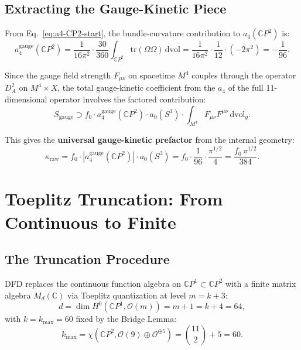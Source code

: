 \documentclass[12pt,a4paper]{article}
\begin{document}
\subsection{Extracting the Gauge-Kinetic Piece}

From Eq.~\eqref{eq:a4-CP2-start}, the bundle-curvature contribution
to $a_4(\mathbb{C}P^2)$ is:
\begin{equation}\label{eq:gauge-kinetic-piece}
a_4^{\mathrm{gauge}}(\mathbb{C}P^2)
= \frac{1}{16\pi^2} \cdot \frac{30}{360}
\int_{\mathbb{C}P^2} \mathrm{tr}(\Omega\Omega)\,\mathrm{dvol}
= \frac{1}{16\pi^2} \cdot \frac{1}{12} \cdot (-2\pi^2)
= -\frac{1}{96}.
\end{equation}

Since the gauge field strength $F_{\mu\nu}$ on spacetime $M^4$ couples
through the operator $D_A^2$ on $M^4 \times X$, the total gauge-kinetic
coefficient from the $a_4$ of the full 11-dimensional operator involves the
factored contribution:
\begin{equation}\label{eq:gauge-kinetic-total}
S_{\mathrm{gauge}} \supset f_0 \cdot a_4^{\mathrm{gauge}}(\mathbb{C}P^2)
\cdot a_0(S^3) \cdot \int_{M^4} F_{\mu\nu}F^{\mu\nu}\,\mathrm{dvol}_g.
\end{equation}

This gives the \textbf{universal gauge-kinetic prefactor} from the
internal geometry:
\begin{equation}\label{eq:kappa-raw-def}
\kappa_{\mathrm{raw}} = f_0 \cdot
\left|a_4^{\mathrm{gauge}}(\mathbb{C}P^2)\right| \cdot a_0(S^3)
= f_0 \cdot \frac{1}{96} \cdot \frac{\pi^{1/2}}{4}
= \frac{f_0\,\pi^{1/2}}{384}.
\end{equation}

\section{Toeplitz Truncation: From Continuous to Finite}
\label{sec:toeplitz}

\subsection{The Truncation Procedure}

DFD replaces the continuous function algebra on $\mathbb{C}P^1 \subset
\mathbb{C}P^2$ with a finite matrix algebra $M_d(\mathbb{C})$ via
Toeplitz quantization at level $m = k + 3$:
\begin{equation}
d = \dim H^0(\mathbb{C}P^1, \mathcal{O}(m)) = m + 1 = k + 4 = 64,
\end{equation}
with $k = k_{\max} = 60$ fixed by the Bridge Lemma:
\begin{equation}
k_{\max} = \chi(\mathbb{C}P^2, \mathcal{O}(9) \oplus \mathcal{O}^{\oplus 5})
= \binom{11}{2} + 5 = 60.
\end{equation}
\end{document}
